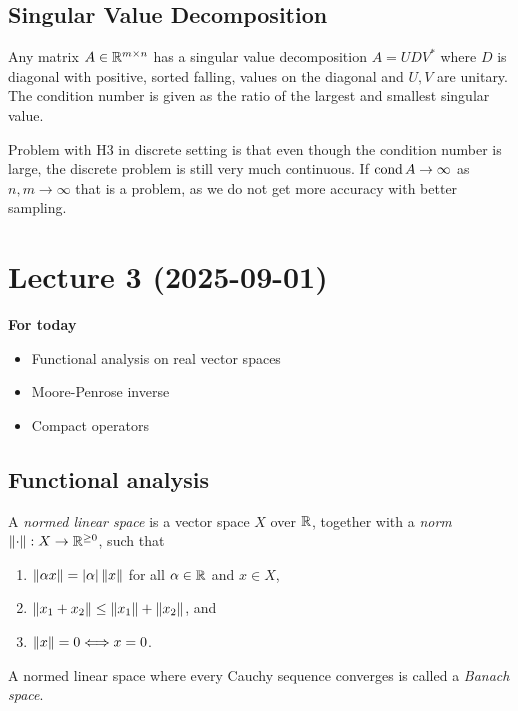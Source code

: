 \documentclass[12pt]{article}
\begin{document}
\subsection{Singular Value Decomposition}
Any matrix $A\in\mathbb{R}^{m\times n}$ has a singular value decomposition $A=UDV^*$ where $D$ is diagonal with positive, sorted falling, values on the diagonal and $U,V$ are unitary. The condition number is given as the ratio of the largest and smallest singular value.

Problem with H3 in discrete setting is that even though the condition number is large, the discrete problem is still very much continuous. If $\operatorname{cond} A\to \infty$ as $n,m\to\infty$ that is a problem, as we do not get more accuracy with better sampling.

\newpage

\section{Lecture 3 (2025-09-01)}
\textbf{For today}
\begin{itemize}
    \item Functional analysis on real vector spaces
    \item Moore-Penrose inverse
    \item Compact operators
\end{itemize}

\subsection{Functional analysis}
\begin{definition}
    A \textit{normed linear space} is a vector space $X$ over $\mathbb{R}$, together with a \textit{norm} $\left\lVert\cdot\right\rVert:X\to\mathbb{R}^{\geq0}$, such that 
    \begin{enumerate}[label=(\alph*)]
        \item $\left\lVert\alpha x\right\rVert=|\alpha|\left\lVert x\right\rVert$ for all $\alpha\in \mathbb{R}$ and $x\in X$,
        \item $\left\lVert x_1+x_2\right\rVert\leq \left\lVert x_1\right\rVert+\left\lVert x_2\right\rVert$, and
        \item $\left\lVert x\right\rVert=0\Longleftrightarrow x=0$. 
    \end{enumerate}
\end{definition}

\begin{definition}
    A normed linear space where every Cauchy sequence converges is called a \textit{Banach space}. 
\end{definition}
\end{document}

